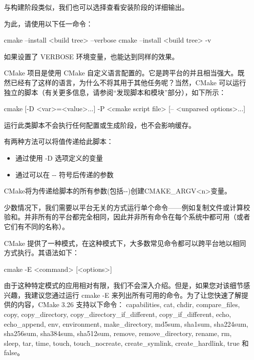 
与构建阶段类似，我们也可以选择查看安装阶段的详细输出。

为此，请使用以下任一命令：

\begin{shell}
cmake --install <build tree> --verbose
cmake --install <build tree> -v
\end{shell}

如果设置了 VERBOSE 环境变量，也能达到同样的效果。


CMake 项目是使用 CMake 自定义语言配置的。它是跨平台的并且相当强大。既然已经有了这样的语言，为什么不将其用于其他任务呢？当然，CMake 可以运行独立的脚本（有关更多信息，请参阅“发现脚本和模块”部分），如下所示：

\begin{shell}
cmake [{-D <var>=<value>}...] -P <cmake script file>
      [-- <unparsed options>...]
\end{shell}

运行此类脚本不会执行任何配置或生成阶段，也不会影响缓存。

有两种方法可以将值传递给此脚本：

\begin{itemize}
\item
通过使用 -D 选项定义的变量

\item
通过可以在 -{}- 符号后传递的参数
\end{itemize}

CMake将为传递给脚本的所有参数(包括-{}-)创建CMAKE\_ARGV<n>变量。


少数情况下，我们需要以平台无关的方式运行单个命令——例如复制文件或计算校验和。并非所有的平台都完全相同，因此并非所有命令在每个系统中都可用（或者它们有不同的名称）。

CMake 提供了一种模式，在这种模式下，大多数常见命令都可以跨平台地以相同方式执行。其语法如下：

\begin{shell}
cmake -E <command> [<options>]
\end{shell}

由于这种特定模式的应用相对有限，我们不会深入介绍。但是，如果您对该细节感兴趣，我建议您通过运行 cmake -E 来列出所有可用的命令。为了让您快速了解提供的内容，CMake 3.26 支持以下命令： capabilities, cat, chdir, compare\_files, copy, copy\_directory, copy\_directory\_if\_different, copy\_if\_different, echo, echo\_append, env, environment, make\_directory, md5sum, sha1sum, sha224sum, sha256sum, sha384sum, sha512sum, remove, remove\_directory, rename, rm, sleep, tar, time, touch, touch\_nocreate, create\_symlink, create\_hardlink, true 和 false。

